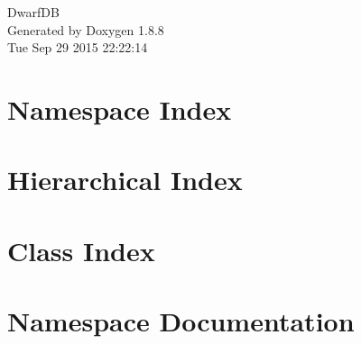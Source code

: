 \documentclass[twoside]{book}
\newcommand{\+}{\discretionary{\mbox{\scriptsize$\hookleftarrow$}}{}{}}
\newcommand{\clearemptydoublepage}{%
  \newpage{\pagestyle{empty}\cleardoublepage}%
}
\begin{document}
\hypersetup{pageanchor=false,
             bookmarks=true,
             bookmarksnumbered=true,
             pdfencoding=unicode
            }
\begin{titlepage}
\vspace*{7cm}
\begin{center}%
{\Large Dwarf\+D\+B }\\
\vspace*{1cm}
{\large Generated by Doxygen 1.8.8}\\
\vspace*{0.5cm}
{\small Tue Sep 29 2015 22:22:14}\\
\end{center}
\end{titlepage}
\clearemptydoublepage
\tableofcontents
\clearemptydoublepage
{}
\hypersetup{pageanchor=true}

\chapter{Namespace Index}

\chapter{Hierarchical Index}

\chapter{Class Index}

\chapter{Namespace Documentation}















\end{document}
